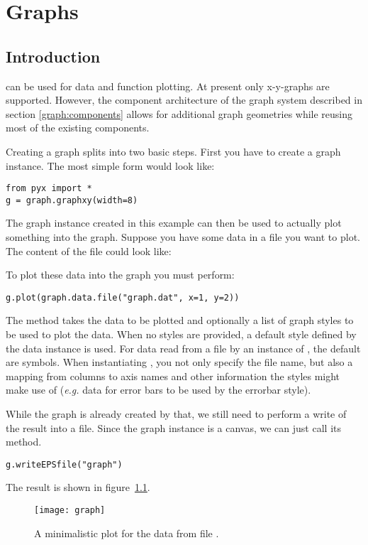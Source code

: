\chapter{Graphs}
\label{graph}
\section{Introduction}
\PyX{} can be used for data and function plotting. At present only
x-y-graphs are supported. However, the component architecture of the
graph system described in section \ref{graph:components} allows for
additional graph geometries while reusing most of the existing
components.

Creating a graph splits into two basic steps. First you have to create
a graph instance. The most simple form would look like:
\begin{verbatim}
from pyx import *
g = graph.graphxy(width=8)
\end{verbatim}
The graph instance  created in this example can then be used
to actually plot something into the graph. Suppose you have some data
in a file  you want to plot. The content of the file
could look like:

To plot these data into the graph  you must perform:
\begin{verbatim}
g.plot(graph.data.file("graph.dat", x=1, y=2))
\end{verbatim}
The method  takes the data to be plotted and optionally
a list of graph styles to be used to plot the data. When no styles are
provided, a default style defined by the data instance is used. For
data read from a file by an instance of , the
default are symbols. When instantiating , you
not only specify the file name, but also a mapping from columns to
axis names and other information the styles might make use of
(\emph{e.g.} data for error bars to be used by the errorbar style).

While the graph is already created by that, we still need to perform a
write of the result into a file. Since the graph instance is a canvas,
we can just call its  method.
\begin{verbatim}
g.writeEPSfile("graph")
\end{verbatim}
The result  is shown in figure~\ref{fig:graph}.

\begin{figure}[ht]
\centerline{\texttt{[image: graph]}}
\caption{A minimalistic plot for the data from file .}
\label{fig:graph}
\end{figure}

